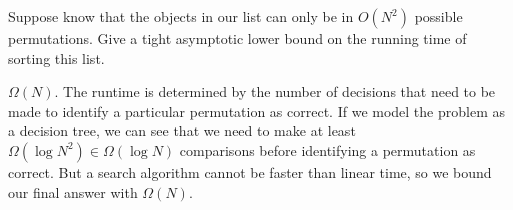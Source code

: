 \question Suppose know that the objects in our list can only be in $O(N^2)$
possible permutations. Give a tight asymptotic lower bound on the running time
of sorting this list.

\begin{solution}[1in]
$\Omega(N)$. The runtime is determined by the number of decisions that need to
be made to identify a particular permutation as correct. If we model the
problem as a decision tree, we can see that we need to make at least
$\Omega(\log{N^2}) \in \Omega(\log N)$ comparisons before identifying a
permutation as correct. But a search algorithm cannot be faster than linear
time, so we bound our final answer with $\Omega(N)$.
\end{solution}
